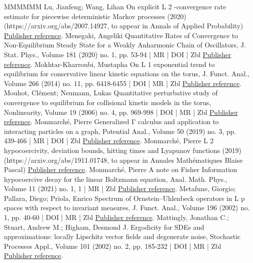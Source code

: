 \begin{thebibliography}{MMMMMM}
 Lu, Jianfeng; Wang, Lihan On explicit L 2 -convergence rate estimate for piecewise deterministic Markov processes (2020) (https://arxiv.org/abs/2007.14927, to appear in Annals of Applied Probability) \href{https://ahl.centre-mersenne.org/item/AHL_2022__5__523_0/#LW20}{Publisher reference}.
 Menegaki, Angeliki Quantitative Rates of Convergence to Non-Equilibrium Steady State for a Weakly Anharmonic Chain of Oscillators, J. Stat. Phys., Volume 181 (2020) no. 1, pp. 53-94 | MR | DOI | Zbl \href{https://ahl.centre-mersenne.org/item/AHL_2022__5__523_0/#Menegaki19}{Publisher reference}.
 Mokhtar-Kharroubi, Mustapha On L 1 exponential trend to equilibrium for conservative linear kinetic equations on the torus, J. Funct. Anal., Volume 266 (2014) no. 11, pp. 6418-6455 | DOI | MR | Zbl \href{https://ahl.centre-mersenne.org/item/AHL_2022__5__523_0/#Mokhtar14}{Publisher reference}.
 Mouhot, Clément; Neumann, Lukas Quantitative perturbative study of convergence to equilibrium for collisional kinetic models in the torus, Nonlinearity, Volume 19 (2006) no. 4, pp. 969-998 | DOI | MR | Zbl \href{https://ahl.centre-mersenne.org/item/AHL_2022__5__523_0/#MN06}{Publisher reference}.
 Monmarché, Pierre Generalized Γ calculus and application to interacting particles on a graph, Potential Anal., Volume 50 (2019) no. 3, pp. 439-466 | MR | DOI | Zbl \href{https://ahl.centre-mersenne.org/item/AHL_2022__5__523_0/#Mon19a}{Publisher reference}.
 Monmarché, Pierre L 2 hypocoercivity, deviation bounds, hitting times and Lyapunov functions (2019) (https://arxiv.org/abs/1911.01748, to appear in Annales Mathématiques Blaise Pascal) \href{https://ahl.centre-mersenne.org/item/AHL_2022__5__523_0/#Mon19b}{Publisher reference}.
 Monmarché, Pierre A note on Fisher Information hypocoercive decay for the linear Boltzmann equation, Anal. Math. Phys., Volume 11 (2021) no. 1, 1 | MR | Zbl \href{https://ahl.centre-mersenne.org/item/AHL_2022__5__523_0/#Mon17}{Publisher reference}.
 Metafune, Giorgio; Pallara, Diego; Priola, Enrico Spectrum of Ornstein–Uhlenbeck operators in L p spaces with respect to invariant measures, J. Funct. Anal., Volume 196 (2002) no. 1, pp. 40-60 | DOI | MR | Zbl \href{https://ahl.centre-mersenne.org/item/AHL_2022__5__523_0/#MPP02}{Publisher reference}.
 Mattingly, Jonathan C.; Stuart, Andrew M.; Higham, Desmond J. Ergodicity for SDEs and approximations: locally Lipschitz vector fields and degenerate noise, Stochastic Processes Appl., Volume 101 (2002) no. 2, pp. 185-232 | DOI | MR | Zbl \href{https://ahl.centre-mersenne.org/item/AHL_2022__5__523_0/#MSH02}{Publisher reference}.

\end{thebibliography}
